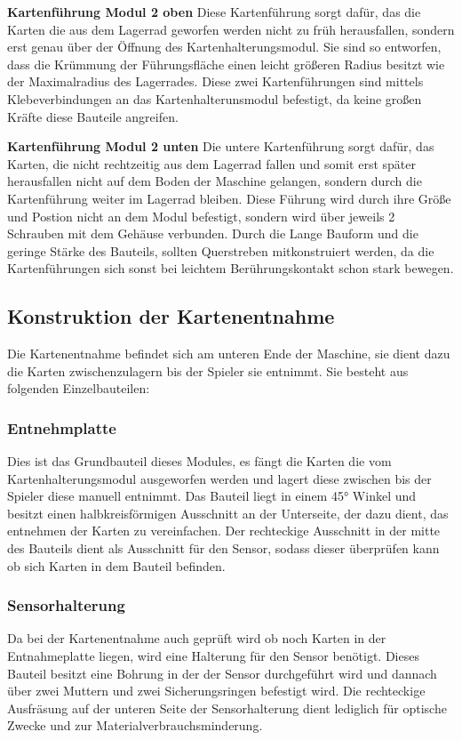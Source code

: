 \textbf{Kartenführung Modul 2 oben}
Diese Kartenführung sorgt dafür, das die Karten die aus dem Lagerrad geworfen werden nicht zu früh herausfallen,
sondern erst genau über der Öffnung des Kartenhalterungsmodul. Sie sind so entworfen, dass die Krümmung der Führungsfläche einen leicht
größeren Radius besitzt wie der Maximalradius des Lagerrades. Diese zwei Kartenführungen sind mittels Klebeverbindungen
an das Kartenhalterunsmodul befestigt, da keine großen Kräfte diese Bauteile angreifen.

\textbf{Kartenführung Modul 2 unten}
Die untere Kartenführung sorgt dafür, das Karten, die nicht rechtzeitig aus dem Lagerrad fallen und somit erst später
herausfallen nicht auf dem Boden der Maschine gelangen, sondern durch die Kartenführung weiter im Lagerrad bleiben. Diese Führung
wird durch ihre Größe und Postion nicht an dem Modul befestigt, sondern wird über jeweils 2 Schrauben mit dem Gehäuse
verbunden. Durch die Lange Bauform und die geringe Stärke des Bauteils, sollten Querstreben mitkonstruiert werden,
da die Kartenführungen sich sonst bei leichtem Berührungskontakt schon stark bewegen.

\subsection{Konstruktion der Kartenentnahme}
Die Kartenentnahme befindet sich am unteren Ende der Maschine, sie dient dazu die Karten zwischenzulagern bis der Spieler
sie entnimmt. Sie besteht aus folgenden Einzelbauteilen:

\subsubsection{Entnehmplatte}
Dies ist das Grundbauteil dieses Modules, es fängt  die Karten die vom Kartenhalterungsmodul ausgeworfen werden und lagert diese zwischen bis
der Spieler diese manuell entnimmt. Das Bauteil liegt in einem 45° Winkel und besitzt einen halbkreisförmigen Ausschnitt
an der Unterseite, der dazu dient, das entnehmen der Karten zu vereinfachen. Der rechteckige Ausschnitt in der mitte des
Bauteils dient als Ausschnitt für den Sensor, sodass dieser überprüfen kann ob sich Karten in dem Bauteil befinden.

\subsubsection{Sensorhalterung}
Da bei der Kartenentnahme auch geprüft wird ob noch Karten in der Entnahmeplatte liegen, wird eine Halterung für den
Sensor benötigt. Dieses Bauteil besitzt eine Bohrung in der der Sensor durchgeführt wird und dannach über zwei Muttern und
zwei Sicherungsringen befestigt wird. Die rechteckige Ausfräsung auf der unteren Seite der Sensorhalterung dient lediglich
für optische Zwecke und zur Materialverbrauchsminderung.

